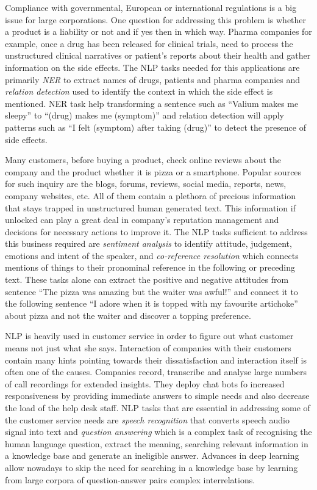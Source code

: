 Compliance with governmental, European or international regulations is a big issue for large corporations. One question for addressing this problem is whether a product is a liability or not and if yes then in which way. Pharma companies for example, once a drug has been released for clinical trials, need to process the unstructured clinical narratives or patient's reports about their health and gather information on the side effects. The NLP tasks needed for this applications are primarily \textit{NER} to extract names of drugs, patients and pharma companies and \textit{relation detection} used to identify the context in which the side effect is mentioned. NER task help transforming a sentence such as ``Valium makes me sleepy'' to ``(drug) makes me (symptom)'' and relation detection will apply patterns such as ``I felt (symptom) after taking (drug)'' to detect the presence of side effects.

Many customers, before buying a product, check online reviews about the company and the product whether it is pizza or a smartphone. Popular sources for such inquiry are the blogs, forums, reviews, social media, reports, news, company websites, etc. All of them contain a plethora of precious information that stays trapped in unstructured human generated text. This information if unlocked can play a great deal in company's reputation management and decisions for necessary actions to improve it. The NLP tasks sufficient to address this business required are \textit{sentiment analysis} to identify attitude, judgement, emotions and intent of the speaker, and \textit{co-reference resolution} which connects mentions of things to their pronominal reference in the following or preceding text. These tasks alone can extract the positive and negative attitudes from sentence ``The pizza was amazing but the waiter was awful!'' and connect it to the following sentence ``I adore when it is topped with my favourite artichoke'' about pizza and not the waiter and discover a topping preference.

NLP is heavily used in customer service in order to figure out what customer means not just what she says. Interaction of companies with their customers contain many hints pointing towards their dissatisfaction and interaction itself is often one of the causes. Companies record, transcribe and analyse large numbers of call recordings for extended insights. They deploy chat bots fo increased responsiveness by providing immediate answers to simple needs and also decrease the load of the help desk staff. NLP tasks that are essential in addressing some of the customer service needs are \textit{speech recognition} that converts speech audio signal into text and \textit{question answering} which is a complex task of recognising the human language question, extract the meaning, searching relevant information in a knowledge base and generate an ineligible answer. Advances in deep learning allow nowadays to skip the need for searching in a knowledge base by learning from large corpora of question-answer pairs complex interrelations. 

